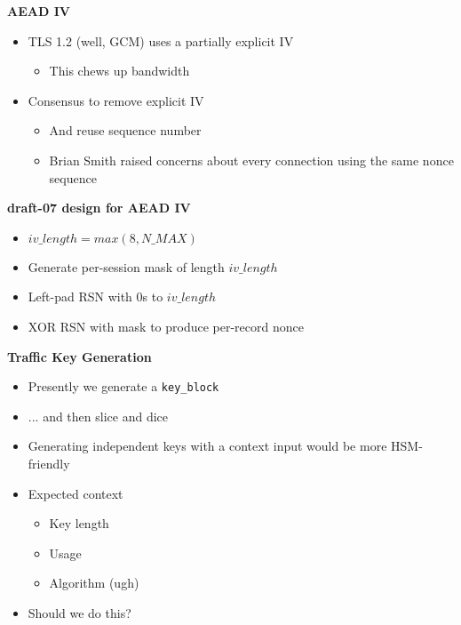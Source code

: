 \documentclass[helvetica]{seminar}
\newcommand{\heading}[1]{%
  \begin{center} 
    \large\bf 
    #1 
  \end{center} 
  \vspace{.4 in}}
\begin{document}
\begin{slide}
\heading{AEAD IV}

\begin{itemize}
\item TLS 1.2 (well, GCM) uses a partially explicit IV
  \begin{itemize}
  \item This chews up bandwidth
  \end{itemize}
  
\item Consensus to remove explicit IV
  \begin{itemize}
  \item And reuse sequence number
  \item Brian Smith raised concerns about every connection using the same nonce sequence
  \end{itemize}
\end{itemize}
\end{slide}


\begin{slide}
\heading{draft-07 design for AEAD IV}

\begin{itemize}
\item $iv\_length = max(8, N\_MAX)$
\item Generate per-session mask of length $iv\_length$
\item Left-pad RSN with 0s to $iv\_length$
\item XOR RSN with mask to produce per-record nonce
\end{itemize}
\end{slide}



\begin{slide}
\heading{Traffic Key Generation}

\begin{itemize}
\item Presently we generate a \verb^key_block^
\item ... and then slice and dice
\item Generating independent keys with a context input would be more HSM-friendly
\item Expected context
  \begin{itemize}
  \item Key length
  \item Usage
  \item Algorithm (ugh)
  \end{itemize}
\item Should we do this?
\end{itemize}
\end{slide}
\end{document}

